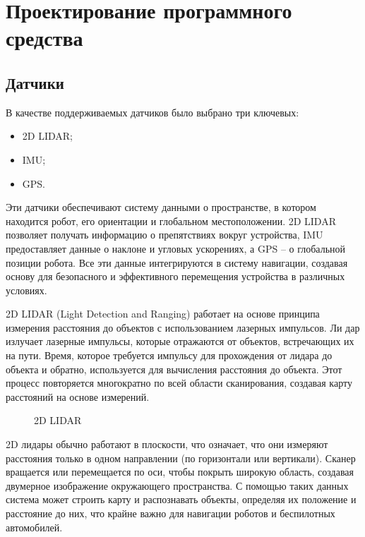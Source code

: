 \def \statemodule {MotionEstimation}
\def \handleevent {Алгоритм обработки событий}

\section{Проектирование программного средства}
\subsection{Датчики}
В качестве поддерживаемых датчиков было выбрано три ключевых:
\begin{itemize}
	\item 2D LIDAR;
	\item IMU;
	\item GPS.
\end{itemize}

Эти датчики обеспечивают систему данными о пространстве, в котором находится
робот, его ориентации и глобальном местоположении.
2D LIDAR позволяет получать информацию о препятствиях вокруг устройства, IMU
предоставляет данные о наклоне и угловых ускорениях, а GPS -- о глобальной
позиции робота. Все эти данные интегрируются в систему навигации, создавая
основу для безопасного и эффективного перемещения устройства в различных
условиях.

2D LIDAR (Light Detection and Ranging) работает на основе принципа измерения
расстояния до объектов с использованием лазерных импульсов. Ли дар излучает
лазерные импульсы, которые отражаются от объектов, встречающих их на пути.
Время, которое требуется импульсу для прохождения от лидара до объекта и
обратно, используется для вычисления расстояния до объекта. Этот процесс
повторяется многократно по всей области сканирования, создавая карту расстояний
на основе измерений.

\begin{figure}[h]
\centering
\caption{2D LIDAR}
\end{figure}

2D лидары обычно работают в плоскости, что означает, что они измеряют расстояния
только в одном направлении (по горизонтали или вертикали). Сканер вращается или
перемещается по оси, чтобы покрыть широкую область, создавая двумерное
изображение окружающего пространства. С помощью таких данных система может
строить карту и распознавать объекты, определяя их положение и расстояние до
них, что крайне важно для навигации роботов и беспилотных автомобилей.

